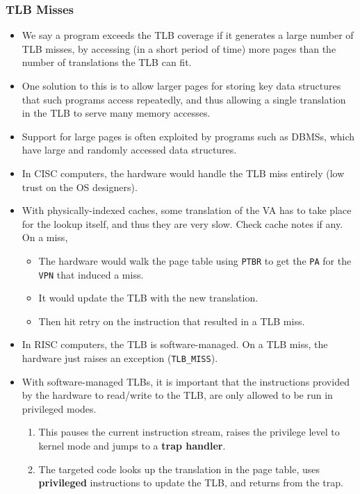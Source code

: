 \documentclass[10pt]{report}
\begin{document}
\subsubsection{TLB Misses}
\begin{itemize}
\item We say a program exceeds the TLB coverage if it generates
a large number of TLB misses, by accessing (in a short period of time) more pages than the number of translations the TLB can fit.
\item One solution to this is to allow larger pages for storing
key data structures that such programs access repeatedly, and thus
allowing a single translation in the TLB to serve many memory accesses.
\item Support for large pages is often exploited by programs such as DBMSs, which have large and randomly accessed data structures.
\item In CISC computers, the hardware would handle the TLB miss entirely (low trust on the OS designers).
\item With physically-indexed caches, some translation of the VA has to take place for the lookup itself, and thus they are very slow. Check cache notes if any.
\\On a miss,
\begin{itemize}
    \item The hardware would walk the page table using \texttt{PTBR} to get the \texttt{PA} for the \texttt{VPN} that induced a miss.
    \item It would update the TLB with the new translation.
    \item Then hit retry on the instruction that resulted in a TLB miss.
\end{itemize}
\item In RISC computers, the TLB is software-managed. On a TLB miss, the hardware just raises an exception (\texttt{TLB\_MISS}).
\item With software-managed TLBs, it is important that the instructions provided by the hardware to read/write to the TLB,
are only allowed to be run in privileged modes.
\begin{enumerate}
\item This pauses the current instruction stream, raises the privilege level to kernel mode and jumps to a \textbf{trap handler}.
\item The targeted code looks up the translation in the page table, uses \textbf{privileged} instructions to update the TLB, and returns from the trap.
\end{enumerate}

\end{itemize}
\end{document}
